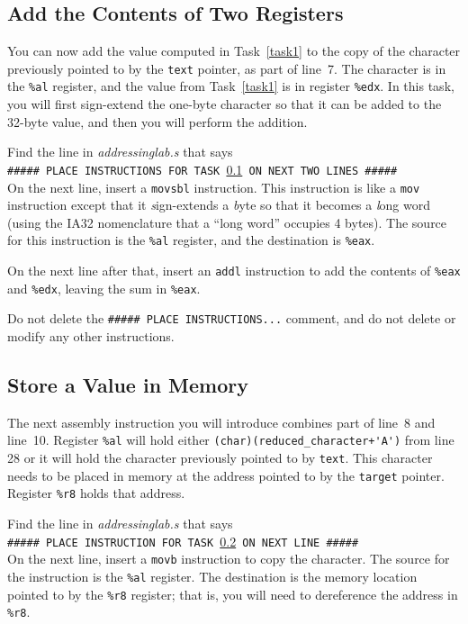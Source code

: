 \subsection{Add the Contents of Two Registers}\label{task3}

You can now add the value computed in Task~\ref{task1} to the copy of the
character previously pointed to by the \lstinline{text} pointer, as part of
line~7. The character is in the \lstinline{%al} register, and the value from
Task~\ref{task1} is in register \lstinline{%edx}. In this task, you will first
sign-extend the one-byte character so that it can be added to the 32-byte
value, and then you will perform the addition.

Find the line in \textit{addressinglab.s} that says \\
\texttt{\#\#\#\#\# PLACE INSTRUCTIONS FOR TASK \ref{task3} ON NEXT TWO LINES \#\#\#\#\#} \\
On the next line, insert a \lstinline{movsbl} instruction. This instruction is
like a \lstinline{mov} instruction except that it \textit{s}ign-extends a
\textit{b}yte so that it becomes a \textit{l}ong word (using the IA32
nomenclature that a ``long word'' occupies 4 bytes). The source for this
instruction is the \lstinline{%al} register, and the destination is
\lstinline{%eax}.

On the next line after that, insert an \lstinline{addl} instruction to add the
contents of \lstinline{%eax} and \lstinline{%edx}, leaving the sum in
\lstinline{%eax}.


Do not delete the \texttt{\#\#\#\#\# PLACE INSTRUCTIONS...} comment, and do not
delete or modify any other instructions.

\subsection{Store a Value in Memory}\label{task4}

The next assembly instruction you will introduce combines part of line~8 and
line~10. Register \lstinline{%al} will hold either
\lstinline{(char)(reduced_character+'A')} from line 28 or it will hold the
character previously pointed to by \lstinline{text}. This character needs to be
placed in memory at the address pointed to by the \lstinline{target} pointer.
Register \lstinline{%r8} holds that address.

Find the line in \textit{addressinglab.s} that says \\
\texttt{\#\#\#\#\# PLACE INSTRUCTION FOR TASK \ref{task4} ON NEXT LINE \#\#\#\#\#} \\
On the next line, insert a \lstinline{movb} instruction to copy the character.
The source for the instruction is the \lstinline{%al} register. The destination
is the memory location pointed to by the \lstinline{%r8} register; that is, you
will need to dereference the address in \lstinline{%r8}.

